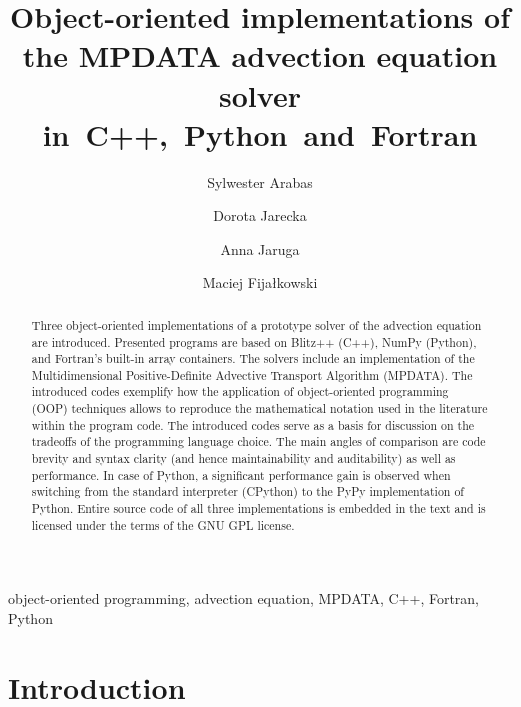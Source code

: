 \documentclass[final,5p,times,twocolumn]{elsarticle}
\begin{document}
  \begin{frontmatter}

    \title{
      Object-oriented implementations of the MPDATA advection equation solver in~C++,~Python~and~Fortran
    }

    \author[1]{Sylwester Arabas}
    \author[1]{Dorota Jarecka}
    \author[1]{Anna Jaruga}
    \author[2]{Maciej Fijałkowski}

    \address[1]{Institute of Geophysics, Faculty of Physics, University of Warsaw}
    \address[2]{PyPy Team}

    \begin{abstract}
        Three object-oriented implementations of a prototype solver of the advection equation are introduced.
        Presented programs are based on Blitz++ (C++), NumPy (Python), and Fortran's built-in array containers.
        The solvers include an implementation of the Multidimensional Positive-Definite 
          Advective Transport Algorithm (MPDATA).
        The introduced codes exemplify how the application of 
          object-oriented programming (OOP) techniques allows to reproduce the mathematical notation 
          used in the literature within the program code.
        The introduced codes serve as a basis for discussion on the tradeoffs of the programming language choice.
        The main angles of comparison are code brevity and syntax clarity
          (and hence maintainability and auditability) as well as performance.
        In case of Python, a significant performance gain is observed when switching from the standard 
          interpreter (CPython) to the PyPy implementation of Python.
        Entire source code of all three implementations is embedded in the text and is licensed
          under the terms of the GNU GPL license. 
    \end{abstract}

    \begin{keyword}
      object-oriented programming, advection equation, MPDATA, C++, Fortran, Python
    \end{keyword}

  \end{frontmatter}

  \tableofcontents

  \section{Introduction}
\end{document}
